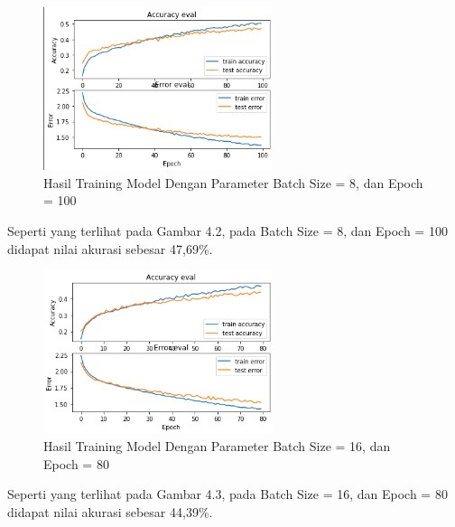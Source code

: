 \begin{figure}[H]
	\centering
	
	\includegraphics[width=0.6\textwidth]{gambar/b8_e100}
	
	\caption{Hasil Training Model Dengan Parameter Batch Size = 8, dan Epoch = 100}
	\label{fig:b8_e100}
\end{figure}

Seperti yang terlihat pada Gambar 4.2, pada Batch Size = 8, dan Epoch = 100 didapat nilai akurasi sebesar 47,69\%.

\begin{figure}[H]
	\centering
	
	\includegraphics[width=0.6\textwidth]{gambar/b16_e80}
	
	\caption{Hasil Training Model Dengan Parameter Batch Size = 16, dan Epoch = 80}
	\label{fig:b16_e80}
\end{figure}

Seperti yang terlihat pada Gambar 4.3, pada Batch Size = 16, dan Epoch = 80 didapat nilai akurasi sebesar 44,39\%.

